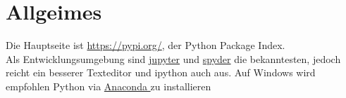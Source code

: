 \section{Allgeimes}
Die Hauptseite ist \url{https://pypi.org/}, der Python Package Index. \\
Als Entwicklungsumgebung sind \href{https://jupyter.org/}{jupyter} und \href{https://www.spyder-ide.org/}{spyder} die bekanntesten, jedoch reicht ein besserer
Texteditor und ipython auch aus. Auf Windows wird empfohlen Python via \href{https://www.anaconda.com/}{Anaconda }zu installieren
